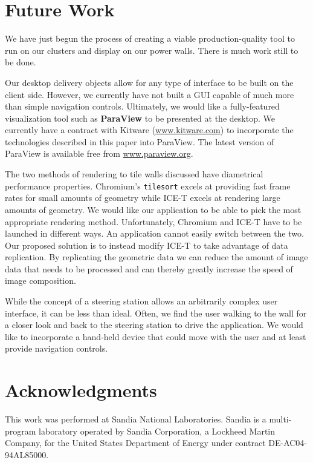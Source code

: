 \documentclass[letterpaper]{acmsiggraph}
\newcommand{\cidentifier}[1]{\texttt{#1}}
\newcommand{\keyterm}[1]{\textbf{#1}}
\begin{document}
  \section{Future Work}
  \label{sec:future_work}

  We have just begun the process of creating a viable production-quality
  tool to run on our clusters and display on our power walls.  There is
  much work still to be done.

  Our desktop delivery objects allow for any type of interface to be built
  on the client side.  However, we currently have not built a GUI capable
  of much more than simple navigation controls.  Ultimately, we would like
  a fully-featured visualization tool such as \keyterm{ParaView}
  \cite{Law01} to be presented at the desktop.  We currently have a
  contract with Kitware (\href{http://www.kitware.com}{www.kitware.com}) to
  incorporate the technologies described in this paper into ParaView.  The
  latest version of ParaView is available free from
  \href{http://www.paraview.org}{www.paraview.org}.

  The two methods of rendering to tile walls discussed have diametrical
  performance properties.  Chromium's \cidentifier{tile\-sort} excels at
  providing fast frame rates for small amounts of geometry while ICE-T
  excels at rendering large amounts of geometry.  We would like our
  application to be able to pick the most appropriate rendering method.
  Unfortunately, Chromium and ICE-T have to be launched in different ways.
  An application cannot easily switch between the two.  Our proposed
  solution is to instead modify ICE-T to take advantage of data
  replication.  By replicating the geometric data we can reduce the amount
  of image data that needs to be processed and can thereby greatly increase
  the speed of image composition.

  While the concept of a steering station allows an arbitrarily complex
  user interface, it can be less than ideal.  Often, we find the user
  walking to the wall for a closer look and back to the steering station to
  drive the application.  We would like to incorporate a hand-held device
  that could move with the user and at least provide navigation controls.


  \section{Acknowledgments}

  This work was performed at Sandia National Laboratories.  Sandia is a
  multi-program laboratory operated by Sandia Corporation, a Lockheed
  Martin Company, for the United States Department of Energy under contract
  DE-AC04-94AL85000.
\end{document}
